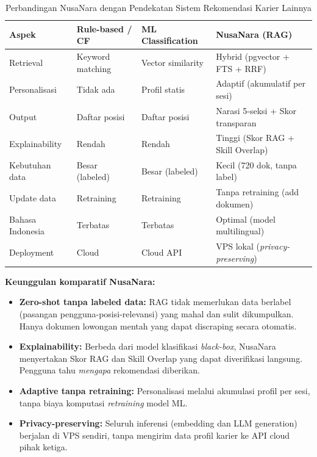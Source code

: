 \begin{table}[H]
\centering
\caption{Perbandingan NusaNara dengan Pendekatan Sistem Rekomendasi Karier Lainnya}
\label{tab:comparison}
\begin{tabularx}{\textwidth}{lXXX}
\toprule
\textbf{Aspek} & \textbf{Rule-based / CF} & \textbf{ML Classification} & \textbf{NusaNara (RAG)} \\
\midrule
Retrieval & Keyword matching & Vector similarity & Hybrid (pgvector + FTS + RRF) \\
Personalisasi & Tidak ada & Profil statis & Adaptif (akumulatif per sesi) \\
Output & Daftar posisi & Daftar posisi & Narasi 5-seksi + Skor transparan \\
Explainability & Rendah & Rendah & Tinggi (Skor RAG + Skill Overlap) \\
Kebutuhan data & Besar (labeled) & Besar (labeled) & Kecil (720 dok, tanpa label) \\
Update data & Retraining & Retraining & Tanpa retraining (add dokumen) \\
Bahasa Indonesia & Terbatas & Terbatas & Optimal (model multilingual) \\
Deployment & Cloud & Cloud API & VPS lokal (\textit{privacy-preserving}) \\
\bottomrule
\end{tabularx}
\end{table}

\noindent \textbf{Keunggulan komparatif NusaNara:}
\begin{itemize}
  \item \textbf{Zero-shot tanpa labeled data:} RAG tidak memerlukan data berlabel
    (pasangan pengguna-posisi-relevansi) yang mahal dan sulit dikumpulkan.
    Hanya dokumen lowongan mentah yang dapat discraping secara otomatis.
  \item \textbf{Explainability:} Berbeda dari model klasifikasi \textit{black-box},
    NusaNara menyertakan Skor RAG dan Skill Overlap yang dapat diverifikasi langsung.
    Pengguna tahu \textit{mengapa} rekomendasi diberikan.
  \item \textbf{Adaptive tanpa retraining:} Personalisasi melalui akumulasi profil
    per sesi, tanpa biaya komputasi \textit{retraining} model ML.
  \item \textbf{Privacy-preserving:} Seluruh inferensi (embedding dan LLM generation)
    berjalan di VPS sendiri, tanpa mengirim data profil karier ke API cloud pihak ketiga.
\end{itemize}
